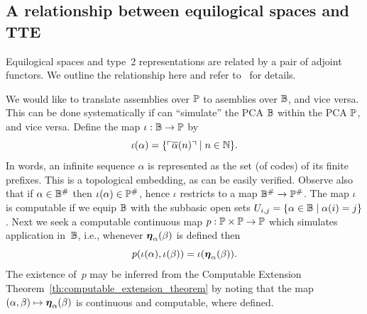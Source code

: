 \subsection{A relationship between equilogical spaces and TTE}
\label{sec:equ-tte}

Equilogical spaces and type~2 representations are related by a pair of
adjoint functors. We outline the relationship here and refer
to~\cite{Bauer:equ-tte} for details.

We would like to translate assemblies over $\mathbb{P}$ to asemblies over
$\mathbb{B}$, and vice versa. This can be done systematically if can
``simulate'' the PCA $\mathbb{B}$ within the PCA $\mathbb{P}$, and vice versa.
%
Define the map $\iota : \mathbb{B} \to \mathbb{P}$ by
\begin{equation*}
  \iota(\alpha) =
  \{ \ulcorner \overline{\alpha}(n) \urcorner \mid n \in \mathbb{N}\}.
\end{equation*}
In words, an infinite sequence $\alpha$ is represented as the set (of
codes) of its finite prefixes. This is a topological embedding, as can
be easily verified. Observe also that if $\alpha \in \mathbb{B}^{\#}$
then $\iota(\alpha) \in \mathbb{P}^{\#}$, hence $\iota$ restricts to a
map $\mathbb{B}^{\#} \to \mathbb{P}^{\#}$.
%
The map $\iota$ is computable if we equip $\mathbb{B}$ with the subbasic
open sets $U_{i,j} = \{\alpha \in \mathbb{B} \mid \alpha(i) = j\}$.
Next we seek a computable continuous map $p : \mathbb{P} \times \mathbb{P} \to
\mathbb{P}$ which simulates application in~$\mathbb{B}$, i.e., whenever
$\text{\boldmath{$\eta$}}_{\alpha}(\beta)$ is defined then
%
\begin{equation*}
  p (\iota(\alpha), \iota(\beta)) = \iota(\text{\boldmath{$\eta$}}_{\alpha}(\beta)).
\end{equation*}
%
The existence of~$p$ may be inferred from the Computable Extension
Theorem~\ref{th:computable_extension_theorem} by noting that the map
$(\alpha, \beta) \mapsto \text{\boldmath{$\eta$}}_{\alpha}(\beta)$ is continuous and
computable, where defined.

